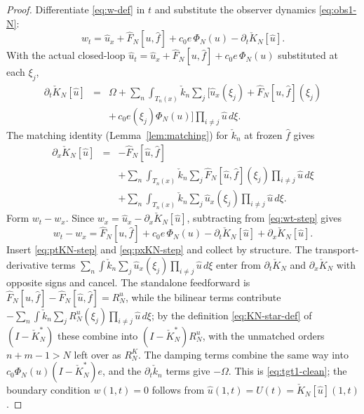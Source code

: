 \documentclass[journal,twoside,web]{ieeecolor}
\begin{document}
\begin{proof}
Differentiate \eqref{eq:w-def} in $t$ and substitute the observer dynamics \eqref{eq:obs1-N}:
\begin{equation}\label{eq:wt-step}
w_t=\hat u_x+\hat F_N[u,\hat f]+c_0 e\,\Phi_N(u)-\partial_t \check K_N[\hat u].
\end{equation}
With the actual closed-loop $\hat u_t=\hat u_x+\hat F_N[u,\hat f]+c_0 e\,\Phi_N(u)$ substituted at each $\xi_j$,
\begin{eqnarray}
\partial_t \check K_N[\hat u] &=& \Omega+\sum_n\!\int_{T_n(x)}\!\!\check k_n\sum_j[\hat u_x(\xi_j)+\hat F_N[u,\hat f](\xi_j) \nonumber\\
&& +\,c_0 e(\xi_j)\Phi_N(u)]\prod_{i\ne j}\hat u\,d\xi. \label{eq:ptKN-step}
\end{eqnarray}
The matching identity (Lemma~\ref{lem:matching}) for $\check k_n$ at frozen $\hat f$ gives
\begin{eqnarray}
\partial_x \check K_N[\hat u] &=& -\hat F_N[\hat u,\hat f] \nonumber\\
&& +\sum_n\!\int_{T_n(x)}\!\!\check k_n\sum_j\hat F_N[\hat u,\hat f](\xi_j)\!\prod_{i\ne j}\!\hat u\,d\xi \nonumber\\
&& +\sum_n\!\int_{T_n(x)}\!\!\check k_n\sum_j\hat u_x(\xi_j)\!\prod_{i\ne j}\!\hat u\,d\xi. \label{eq:pxKN-step}
\end{eqnarray}
Form $w_t-w_x$. Since $w_x=\hat u_x-\partial_x\check K_N[\hat u]$, subtracting from \eqref{eq:wt-step} gives
\begin{equation}\label{eq:wt-wx-assemble}
w_t-w_x=\hat F_N[u,\hat f]+c_0 e\,\Phi_N(u)-\partial_t\check K_N[\hat u]+\partial_x\check K_N[\hat u].
\end{equation}
Insert \eqref{eq:ptKN-step} and \eqref{eq:pxKN-step} and collect by structure. The transport-derivative terms $\sum_n\int\check k_n\sum_j\hat u_x(\xi_j)\prod_{i\ne j}\hat u\,d\xi$ enter from $\partial_t\check K_N$ and $\partial_x\check K_N$ with opposite signs and cancel. The standalone feedforward is $\hat F_N[u,\hat f]-\hat F_N[\hat u,\hat f]=R^u_N$, while the bilinear terms contribute $-\sum_n\int\check k_n\sum_j R^u_N(\xi_j)\prod_{i\ne j}\hat u\,d\xi$; by the definition \eqref{eq:KN-star-def} of $(I-\check K_N^*)$ these combine into $(I-\check K_N^*)R^u_N$, with the unmatched orders $n+m-1>N$ left over as $R^K_N$. The damping terms combine the same way into $c_0\Phi_N(u)(I-\check K_N^*)e$, and the $\partial_t\check k_n$ terms give $-\Omega$. This is \eqref{eq:tgt1-clean}; the boundary condition $w(1,t)=0$ follows from $\hat u(1,t)=U(t)=\check K_N[\hat u](1,t)$.
\end{proof}
\end{document}

